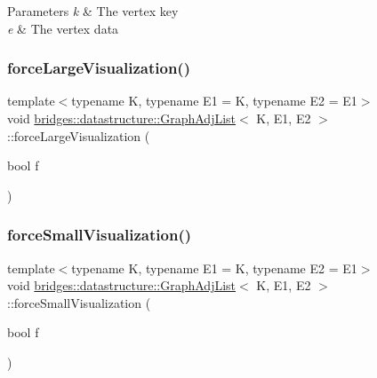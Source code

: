 \begin{DoxyParams}{Parameters}
{\em k} & The vertex key \\
\hline
{\em e} & The vertex data \\
\hline
\end{DoxyParams}
\mbox{\label{classbridges_1_1datastructure_1_1_graph_adj_list_a6860a0a153fd126ebe8b1bc40d2753a7}} 
\subsubsection{\texorpdfstring{force\+Large\+Visualization()}{forceLargeVisualization()}}
{\footnotesize\ttfamily template$<$typename K, typename E1 = K, typename E2 = E1$>$ \\
void \hyperlink{classbridges_1_1datastructure_1_1_graph_adj_list}{bridges\+::datastructure\+::\+Graph\+Adj\+List}$<$ K, E1, E2 $>$\+::force\+Large\+Visualization (\begin{DoxyParamCaption}\item[{bool}]{f }\end{DoxyParamCaption})\hspace{0.3cm}{\ttfamily [inline]}}

\mbox{\label{classbridges_1_1datastructure_1_1_graph_adj_list_a9706e3df7d30320b7e7773a6423e4ff7}} 
\subsubsection{\texorpdfstring{force\+Small\+Visualization()}{forceSmallVisualization()}}
{\footnotesize\ttfamily template$<$typename K, typename E1 = K, typename E2 = E1$>$ \\
void \hyperlink{classbridges_1_1datastructure_1_1_graph_adj_list}{bridges\+::datastructure\+::\+Graph\+Adj\+List}$<$ K, E1, E2 $>$\+::force\+Small\+Visualization (\begin{DoxyParamCaption}\item[{bool}]{f }\end{DoxyParamCaption})\hspace{0.3cm}{\ttfamily [inline]}}

